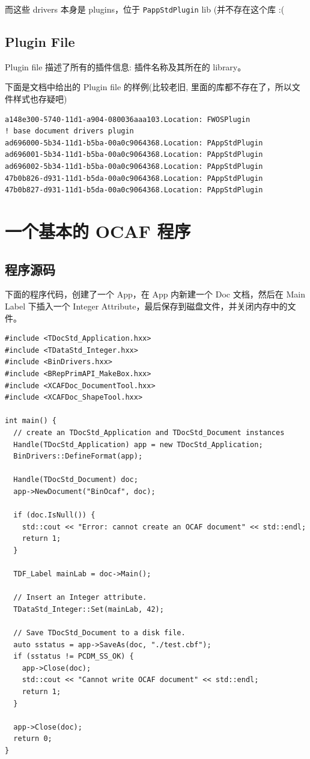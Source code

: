 \documentclass[11pt]{article}
\let\oldsection\section
\renewcommand{\section}{\clearpage\oldsection}
\begin{document}
而这些 drivers 本身是 plugins，位于 \texttt{PappStdPlugin} lib (并不存在这个库 :(
\subsection{Plugin File}
\label{sec:org33caeae}

Plugin file 描述了所有的插件信息: 插件名称及其所在的 library。

下面是文档中给出的 Plugin file 的样例(比较老旧, 里面的库都不存在了，所以文件样式也存疑吧)

\begin{verbatim}
a148e300-5740-11d1-a904-080036aaa103.Location: FWOSPlugin
! base document drivers plugin
ad696000-5b34-11d1-b5ba-00a0c9064368.Location: PAppStdPlugin
ad696001-5b34-11d1-b5ba-00a0c9064368.Location: PAppStdPlugin
ad696002-5b34-11d1-b5ba-00a0c9064368.Location: PAppStdPlugin
47b0b826-d931-11d1-b5da-00a0c9064368.Location: PAppStdPlugin
47b0b827-d931-11d1-b5da-00a0c9064368.Location: PAppStdPlugin
\end{verbatim}
\section{一个基本的 OCAF 程序}
\label{sec:org8418c94}

\subsection{程序源码}
\label{sec:org1ddc531}

下面的程序代码，创建了一个 App，在 App 内新建一个 Doc 文档，然后在 Main Label 下插入一个 Integer Attribute，最后保存到磁盘文件，并关闭内存中的文件。

\begin{verbatim}
#include <TDocStd_Application.hxx>
#include <TDataStd_Integer.hxx>
#include <BinDrivers.hxx>
#include <BRepPrimAPI_MakeBox.hxx>
#include <XCAFDoc_DocumentTool.hxx>
#include <XCAFDoc_ShapeTool.hxx>

int main() {
  // create an TDocStd_Application and TDocStd_Document instances
  Handle(TDocStd_Application) app = new TDocStd_Application;
  BinDrivers::DefineFormat(app);

  Handle(TDocStd_Document) doc;
  app->NewDocument("BinOcaf", doc);

  if (doc.IsNull()) {
    std::cout << "Error: cannot create an OCAF document" << std::endl;
    return 1;
  }

  TDF_Label mainLab = doc->Main();

  // Insert an Integer attribute.
  TDataStd_Integer::Set(mainLab, 42);

  // Save TDocStd_Document to a disk file.
  auto sstatus = app->SaveAs(doc, "./test.cbf");
  if (sstatus != PCDM_SS_OK) {
    app->Close(doc);
    std::cout << "Cannot write OCAF document" << std::endl;
    return 1;
  }

  app->Close(doc);
  return 0;
}
\end{verbatim}
\end{document}
